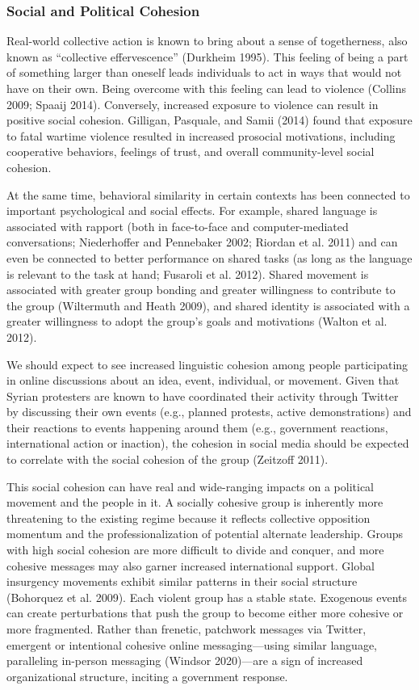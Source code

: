 \documentclass[
  english,
  man]{apa6}
\begin{document}
\hypertarget{social-and-political-cohesion}{%
\subsubsection{Social and Political Cohesion}\label{social-and-political-cohesion}}

Real-world collective action is known to bring about a sense of togetherness,
also known as \enquote{collective effervescence} (Durkheim 1995). This feeling
of being a part of something larger than oneself leads individuals to act in
ways that would not have on their own. Being overcome with this feeling can lead
to violence (Collins 2009; Spaaij 2014). Conversely, increased
exposure to violence can result in positive social cohesion. Gilligan, Pasquale, and Samii (2014)
found that exposure to fatal wartime violence resulted in increased prosocial
motivations, including cooperative behaviors, feelings of trust, and overall
community-level social cohesion.

At the same time, behavioral similarity in certain contexts has been
connected to important psychological and social effects. For example, shared
language is associated with rapport (both in face-to-face and computer-mediated
conversations; Niederhoffer and Pennebaker 2002; Riordan et al. 2011) and
can even be connected to better performance on shared tasks (as long as
the language is relevant to the task at hand; Fusaroli et al. 2012). Shared
movement is associated with greater group bonding and greater willingness
to contribute to the group (Wiltermuth and Heath 2009), and shared identity
is associated with a greater willingness to adopt the group's goals and
motivations (Walton et al. 2012).

We should expect to see increased linguistic cohesion among people participating
in online discussions about an idea, event, individual, or movement. Given that
Syrian protesters are known to have coordinated their activity through Twitter
by discussing their own events (e.g., planned protests, active demonstrations)
and their reactions to events happening around them (e.g., government reactions,
international action or inaction), the cohesion in social media should be
expected to correlate with the social cohesion of the group (Zeitzoff 2011).

This social cohesion can have real and wide-ranging impacts on a political
movement and the people in it. A socially cohesive group is inherently more
threatening to the existing regime because it reflects collective opposition
momentum and the professionalization of potential alternate leadership. Groups
with high social cohesion are more difficult to divide and conquer, and more
cohesive messages may also garner increased international support. Global
insurgency movements exhibit similar patterns in their social structure
(Bohorquez et al. 2009). Each violent group has a stable state. Exogenous events
can create perturbations that push the group to become either more cohesive or
more fragmented. Rather than frenetic, patchwork messages via Twitter, emergent
or intentional cohesive online messaging---using similar language, paralleling
in-person messaging (Windsor 2020)---are a sign of increased organizational
structure, inciting a government response.
\end{document}
